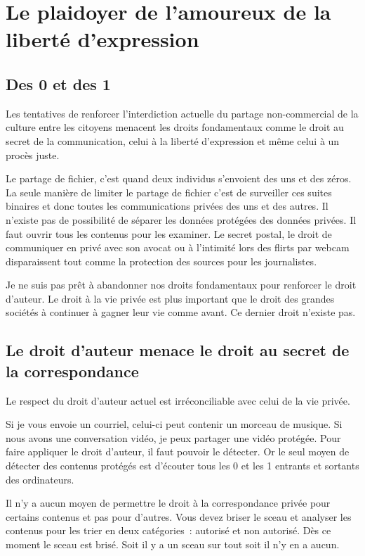 \chapter{Le plaidoyer de l'amoureux de la liberté d'expression}\label{libe}

\section{Des 0 et des 1}
Les tentatives de renforcer l’interdiction actuelle du partage
non-commercial de la culture entre les citoyens menacent les droits fondamentaux comme le droit au
secret de la communication, celui à la liberté d’expression et même celui à un procès juste.

Le partage de fichier, c’est quand deux individus s’envoient des uns et des zéros. La seule manière
de limiter le partage de fichier c’est de surveiller ces suites binaires et donc toutes les
communications privées des uns et des autres. Il n’existe pas de possibilité de séparer les données
protégées des données privées. Il faut ouvrir tous les contenus pour les examiner. Le secret postal,
le droit de communiquer en privé avec son avocat ou à l’intimité lors des flirts par webcam
disparaissent tout comme la protection des sources pour les journalistes.

Je ne suis pas prêt à abandonner nos droits fondamentaux pour renforcer le droit d’auteur. Le
droit à la vie privée est plus important que le droit des grandes sociétés à continuer à gagner leur
vie comme avant. Ce dernier droit n’existe pas.

\section{Le droit d’auteur menace le droit au secret de la correspondance}

Le respect du droit d’auteur actuel est irréconciliable avec celui de la vie
privée.

Si je vous envoie un courriel, celui-ci peut contenir un morceau de musique. Si nous avons une
conversation vidéo, je peux partager une vidéo protégée. Pour faire appliquer le droit d’auteur, il
faut pouvoir le détecter. Or le seul moyen de détecter des contenus protégés est d’écouter tous les
0 et les 1 entrants et sortants des ordinateurs.

Il n’y a aucun moyen de permettre le droit à la correspondance privée pour certains contenus et pas
pour d’autres. Vous devez briser le sceau et analyser les contenus pour les trier en deux catégories~: autorisé et non autorisé. Dès ce moment le sceau est brisé. Soit il y a un sceau sur tout soit
il
n’y en a aucun.

